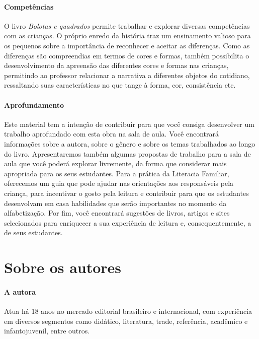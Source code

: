 \documentclass[11pt]{extarticle}
\begin{document}
\paragraph{Competências}
O livro \textit{Bolotas e quadrados} permite trabalhar e explorar diversas competências com as crianças. O próprio enredo da história traz um ensinamento valioso para os pequenos sobre a importância de reconhecer e aceitar as diferenças. Como as diferenças são compreendias em termos de cores e formas, também possibilita o desenvolvimento da apreensão das diferentes cores e formas nas crianças, permitindo ao professor relacionar a narrativa a diferentes objetos do cotidiano, ressaltando suas características no que tange à forma, cor, consistência etc.


\paragraph{Aprofundamento} Este material tem a 
intenção de contribuir para que você consiga desenvolver um trabalho aprofundado 
com esta obra na sala de aula. Você encontrará informações sobre a autora, sobre 
o gênero e sobre os temas trabalhados ao longo do livro. Apresentaremos também 
algumas propostas de trabalho para a sala de aula que você poderá explorar livremente, 
da forma que considerar mais apropriada para os seus estudantes. Para a prática 
da Literacia Familiar, oferecemos um guia que pode ajudar nas orientações aos 
responsáveis pela criança, para incentivar o gosto pela leitura e contribuir para 
que os estudantes desenvolvam em casa habilidades que serão importantes no momento 
da alfabetização. Por fim, você encontrará sugestões de livros, artigos e sites 
selecionados para enriquecer a sua experiência de leitura e, 
consequentemente, a de seus estudantes.



\section{Sobre os autores}

\paragraph{A autora}
Atua há 18 anos no 
mercado editorial brasileiro e internacional, com experiência 
em diversos segmentos como didático, literatura, trade, 
referência, acadêmico e infantojuvenil, entre outros. 
\end{document}
